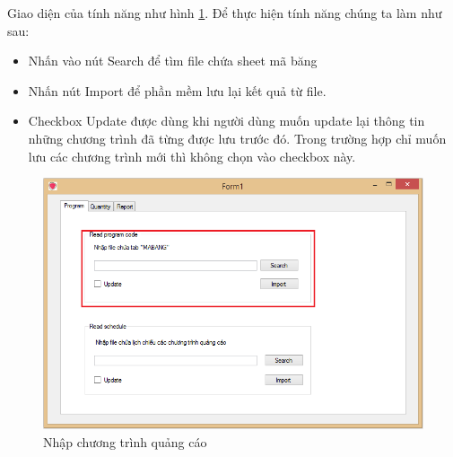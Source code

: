 \documentclass[11pt]{article}
\begin{document}
Giao diện của tính năng như hình \ref{program}. Để thực hiện tính năng chúng ta làm như sau:
\begin{itemize}
	\item Nhấn vào nút Search để tìm file chứa sheet mã băng
	\item Nhấn nút Import để phần mềm lưu lại kết quả từ file.
	\item Checkbox Update được dùng khi người dùng muốn update lại thông tin những chương trình đã từng được lưu trước đó. Trong trường hợp chỉ muốn lưu các chương trình mới thì không chọn vào checkbox này.
\end{itemize}

\begin{figure}[h!]
\begin{center}
	\includegraphics[width=15cm]{program.png}
\end{center}
\caption{Nhập chương trình quảng cáo}
\label{program}
\end{figure}
\end{document}
